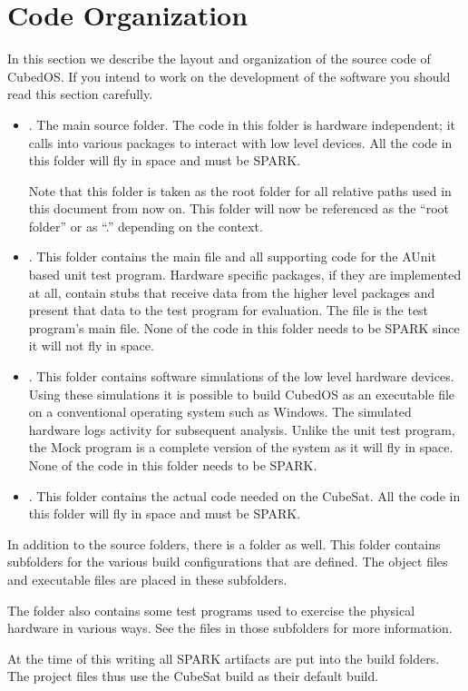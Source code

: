 
\section{Code Organization}
\label{sec:code-organization}

In this section we describe the layout and organization of the source code of CubedOS. If you
intend to work on the development of the software you should read this section carefully.

\begin{itemize}

\item {}. The main source folder. The code in this folder is hardware independent;
  it calls into various packages to interact with low level devices. All the code in this folder
  will fly in space and must be SPARK.

  Note that this folder is taken as the root folder for all relative paths used in this document
  from now on. This folder will now be referenced as the ``root folder'' or as ``.'' depending
  on the context.

\item {}. This folder contains the main file and all supporting code for the AUnit
  based unit test program. Hardware specific packages, if they are implemented at all, contain
  stubs that receive data from the higher level packages and present that data to the test
  program for evaluation. The file  is the test program's main file. None of
  the code in this folder needs to be SPARK since it will not fly in space.

\item {}. This folder contains software simulations of the low level hardware
  devices. Using these simulations it is possible to build CubedOS as an executable file on a
  conventional operating system such as Windows. The simulated hardware logs activity for
  subsequent analysis. Unlike the unit test program, the Mock program is a complete version of
  the system as it will fly in space. None of the code in this folder needs to be SPARK.

\item {}. This folder contains the actual code needed on the CubeSat. All the
  code in this folder will fly in space and must be SPARK.

\end{itemize}

In addition to the source folders, there is a  folder as well. This folder
contains subfolders for the various build configurations that are defined. The object files and
executable files are placed in these subfolders.

The  folder also contains some test programs used to exercise the physical
hardware in various ways. See the  files in those subfolders for more
information.

At the time of this writing all SPARK artifacts are put into the  build
folders. The project files thus use the CubeSat build as their default build.
